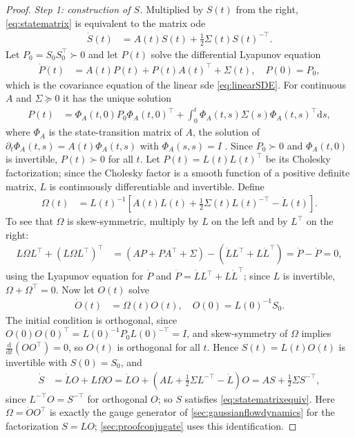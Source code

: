 \documentclass{article} %
\newcommand{\diff}{{\mathrm{d}}}
\begin{document}
\begin{proof}
\emph{Step 1: construction of $S$.} Multiplied by $S(t)$ from the right, \cref{eq:statematrix} is equivalent to the matrix \gls{ode}
\begin{align}
    \dot S(t) &= A(t) S(t) + \frac{1}{2}\Sigma(t) S(t)^{-\top}. \label{eq:statematrixequiv}
\end{align}
Let $P_0 = S_0 S_0^\top \succ 0$ and let $P(t)$ solve the differential Lyapunov equation
\begin{align*}
    \dot P(t) &= A(t) P(t) + P(t) A(t)^\top + \Sigma(t), \quad P(0) = P_0,
\end{align*}
which is the covariance equation of the linear \gls{sde} \cref{eq:linearSDE}. For continuous $A$ and $\Sigma \succeq 0$ it has the unique solution
\begin{align*}
    P(t) &= \Phi_A(t, 0) P_0 \Phi_A(t,0)^\top + \int_0^t \Phi_A(t, s)\Sigma(s)\Phi_A(t,s)^\top \diff s,
\end{align*}
where $\Phi_A$ is the state-transition matrix of $A$, the solution of $\partial_t \Phi_A(t, s) = A(t) \Phi_A(t, s)$ with $\Phi_A(s, s) = I$ \citep{Särkkä_Solin_2019}. Since $P_0 \succ 0$ and $\Phi_A(t, 0)$ is invertible, $P(t) \succ 0$ for all $t$. Let $P(t) = L(t)L(t)^\top$ be its Cholesky factorization; since the Cholesky factor is a smooth function of a positive definite matrix, $L$ is continuously differentiable and invertible. Define
\begin{align*}
    \Omega(t) &= L(t)^{-1}\left[A(t) L(t) +\frac{1}{2}\Sigma(t) L(t)^{-\top}-\dot L(t)\right].
\end{align*}
To see that $\Omega$ is skew-symmetric, multiply by $L$ on the left and by $L^\top$ on the right:
\begin{align*}
    L \Omega L^\top + \left(L \Omega L^\top\right)^\top &= \left(A P + P A^\top + \Sigma\right) - \left(\dot L L^\top + L \dot L^\top\right) = \dot P - \dot P = 0,
\end{align*}
using the Lyapunov equation for $\dot P$ and $\dot P = \dot L L^\top + L \dot L^\top$; since $L$ is invertible, $\Omega + \Omega^\top = 0$. Now let $O(t)$ solve
\begin{align*}
    \dot O(t) &= \Omega(t) O(t), \quad O(0) = L(0)^{-1} S_0.
\end{align*}
The initial condition is orthogonal, since $O(0) O(0)^\top = L(0)^{-1} P_0 L(0)^{-\top} = I$, and skew-symmetry of $\Omega$ implies $\frac{\diff}{\diff t}(O O^\top) = 0$, so $O(t)$ is orthogonal for all $t$. Hence $S(t) = L(t) O(t)$ is invertible with $S(0) = S_0$, and
\begin{align*}
    \dot S &= \dot L O + L \Omega O = \dot L O + \left(A L + \tfrac{1}{2} \Sigma L^{-\top} - \dot L\right) O = A S + \tfrac{1}{2} \Sigma S^{-\top},
\end{align*}
since $L^{-\top} O = S^{-\top}$ for orthogonal $O$; so $S$ satisfies \cref{eq:statematrixequiv}. Here $\Omega = \dot O O^\top$ is exactly the gauge generator of \cref{sec:gaussianflowdynamics} for the factorization $S = L O$; \cref{sec:proofconjugate} uses this identification.


\end{proof}
\end{document}
